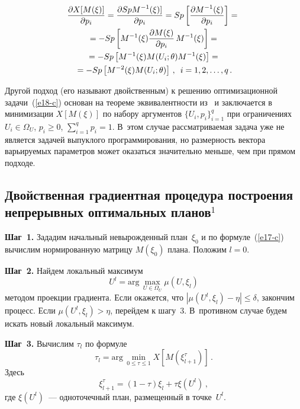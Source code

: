 \begin{multicols}{2}
  \vspace*{-6pt}

\noindent
\begin{multline*}
  \displaystyle\frac{\displaystyle \partial X[M(\xi)]\mathstrut}{\displaystyle \partial p_i\mathstrut}=\displaystyle\frac{\displaystyle \partial Sp M^{-1}(\xi)]\mathstrut}{\displaystyle \partial
p_i\mathstrut}=Sp\left[\displaystyle\frac{\displaystyle \partial M^{-1}(\xi)\mathstrut}{\displaystyle \partial p_i\mathstrut}\right]={}\\
{}=-Sp \left [ M^{-1}(\xi)\displaystyle\frac{\displaystyle \partial M(\xi)\mathstrut}{\displaystyle \partial p_i\mathstrut}\,M^{-1}(\xi)\right]={}\\
{}= -Sp\left[ M^{-1}(\xi) M(U_i;\theta) M^{-1}(\xi)\right]={}\\
{}=
-Sp\left[ M^{-2}(\xi) M(U_i;\theta)\right]\,, \enskip i=1, 2, \ldots , q\,.
\end{multline*}

  Другой подход (его называют двойственным) к решению оптимизационной
задачи~(\ref{e18-c}) основан на теореме эквивалентности из~\cite{21-c} и
заключается в минимизации $X[M(\xi)]$ по набору аргументов
$\{U_i,p_i\}_{i=1}^q$ при ограничениях $U_i\in\Omega_U$, $p_i\geq 0$,
$\sum\limits_{i=1}^q p_i=1$. В~этом случае рассматриваемая задача уже не
является задачей выпуклого программирования, но размерность вектора
варьируемых параметров может оказаться значительно меньше, чем при
прямом подходе.

\subsection{Двойственная градиентная процедура построения
непрерывных оптимальных планов$^1$}

\renewcommand{\thefootnote}{\arabic{footnote}}

\smallskip\textbf{Шаг~1.} Зададим начальный невырожденный план~$\xi_0$ и по
формуле~(\ref{e17-c}) вычислим нормированную матрицу $M(\xi_0)$ плана.
Положим $l=0$.

\smallskip\textbf{Шаг~2.} Найдем локальный максимум
  $$
  U^l=\mathrm{arg}\,\max_{U\in \Omega_U} \mu\left ( U,\xi_l\right)
  $$
методом проекции градиента. Если окажется, что
$\left\vert \mu\left( U^l,\xi_l\right)-\eta\right\vert \leq\delta$,
закончим процесс.
  Если
$
  \mu\left( U^l,\xi_l\right)>\eta$, перейдем к шагу~3. В~противном случае будем искать новый локальный
максимум.

\smallskip\textbf{Шаг~3.} Вычислим $\tau_l$ по формуле
  \begin{equation*}
  \tau_l =\mathrm{arg}\,\min_{0\leq \tau\leq 1} X\left[
M\left(\xi^\tau_{l+1}\right)\right]\,.
\end{equation*}
Здесь
\begin{equation*}
  \xi^\tau_{l+1} =\left(1-\tau\right)\xi_l+\tau\xi\left(U^l\right)\,,
  \end{equation*}
где $\xi(U^l)$~--- одноточечный план, размещенный в точке~$U^l$.


\end{multicols}
